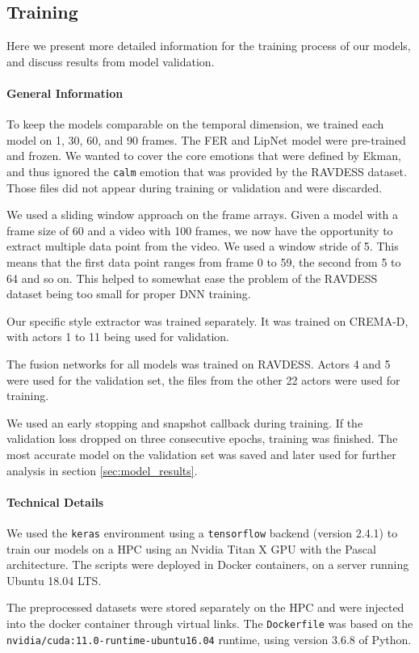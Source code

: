 \subsection{Training}
Here we present more detailed information for the training process of our models, and discuss results from model validation.
\paragraph{General Information}
To keep the models comparable on the temporal dimension, we trained each model on 1, 30, 60, and 90 frames. The FER and LipNet model were pre-trained and frozen. We wanted to cover the core emotions that were defined by Ekman, and thus ignored the \texttt{calm} emotion that was provided by the RAVDESS dataset. Those files did not appear during training or validation and were discarded.

We used a sliding window approach on the frame arrays. Given a model with a frame size of 60 and a video with 100 frames, we now have the opportunity to extract multiple data point from the video. We used a window stride of 5. This means that the first data point ranges from frame 0 to 59, the second from 5 to 64 and so on. This helped to somewhat ease the problem of the RAVDESS dataset being too small for proper DNN training. 

Our specific style extractor was trained separately. It was trained on CREMA-D, with actors 1 to 11 being used for validation.

The fusion networks for all models was trained on RAVDESS. Actors 4 and 5 were used for the validation set, the files from the other 22 actors were used for training.

We used an early stopping and snapshot callback during training. If the validation loss dropped on three consecutive epochs, training was finished. The most accurate model on the validation set was saved and later used for further analysis in section \ref{sec:model_results}.

\paragraph{Technical Details}
We used the \texttt{keras} environment using a \texttt{tensorflow} backend (version 2.4.1) to train our models on a HPC using an Nvidia Titan X GPU with the Pascal architecture. The scripts were deployed in Docker containers, on a server running Ubuntu 18.04 LTS.

The preprocessed datasets were stored separately on the HPC and were injected into the docker container through virtual links. The \texttt{Dockerfile} was based on the \texttt{nvidia/cuda:11.0-runtime-ubuntu16.04} runtime, using version 3.6.8 of Python.

